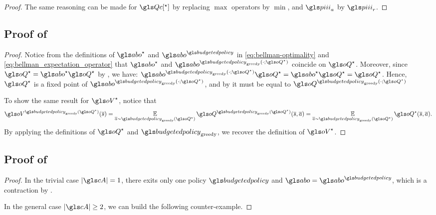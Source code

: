 \begin{subappendices}
\begin{proof}
    The same reasoning can be made for $\Qc[^\star]$ by replacing $\max$ operators by $\min$, and $\policies_a$ by $\policies_r$.
\end{proof}


\subsection{Proof of }
\label{sec:proof-greedy-optim}
\begin{proof}
    Notice from the definitions of $\abo^{\star}$ and $\abo^{\budgetedpolicy}$ in \eqref{eq:bellman-optimality} and \eqref{eq:bellman_expectation_operator} that $\abo^{\star}$ and $\abo^{\budgetedpolicy_\text{greedy}(\cdot;\oQ^{\star})}$ coincide on $\oQ^{\star}$. Moreover, since $\oQ^{\star} = \abo^{\star}\oQ^{\star}$ by , we have: $\abo^{\budgetedpolicy_\text{greedy}(\cdot;\oQ^{\star})} \oQ^{\star} = \abo^{\star} \oQ^{\star} = \oQ^{\star}$.
    Hence, $\oQ^{\star}$ is a fixed point of $\abo^{\budgetedpolicy_\text{greedy}(\cdot;\oQ^{\star})}$, and by  it must be equal to $\oQ^{\budgetedpolicy_\text{greedy}(\cdot;\oQ^{\star})}$

    To show the same result for $\oV^{\star}$, notice that
    \begin{equation*}
        \oV^{\budgetedpolicy_\text{greedy}(\oQ^{\star})}(\os) = \expectedvalueover{\oa\sim\budgetedpolicy_\text{greedy}(\oQ^{\star})}\oQ^{\budgetedpolicy_\text{greedy}(\oQ^{\star})}(\os,\oa) = \expectedvalueover{\oa\sim\budgetedpolicy_\text{greedy}(\oQ^{\star})}\oQ^{\star}(\os,\oa).
    \end{equation*}
    By applying the definitions of $\oQ^{\star}$ and $\budgetedpolicy_\text{greedy}$, we recover the definition of $\oV^{\star}$.
\end{proof}

\subsection{Proof of }
\label{sec:proof-contraction}
\begin{proof}
	In the trivial case $|\cA| = 1$, there exits only one policy $\budgetedpolicy$ and $\abo = \abo^\budgetedpolicy$, which is a contraction by .
	
	In the general case $|\cA| \geq 2$, we can build the following counter-example.
	

\end{proof}
\end{subappendices}
